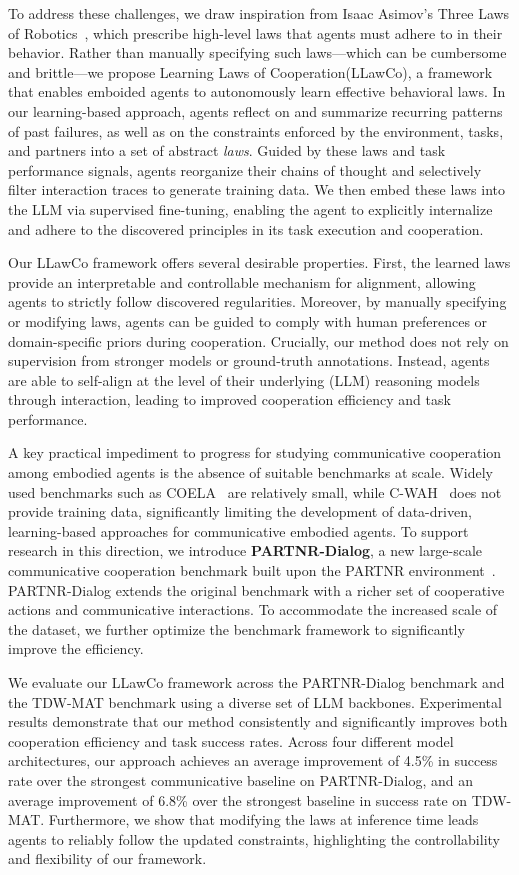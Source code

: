 \documentclass{article}
\theoremstyle{plain}
\theoremstyle{definition}
\theoremstyle{remark}
\newcommand{\fullname}{Learning Laws of Cooperation\xspace}
\newcommand{\name}{LLawCo\xspace}
\begin{document}
To address these challenges, we draw inspiration from Isaac Asimov’s Three Laws of Robotics~\cite{asimov2004robot}, which prescribe high-level laws that agents must adhere to in their behavior. Rather than manually specifying such laws—which can be cumbersome and brittle—we propose \fullname (\name), a framework that enables emboided agents to autonomously learn effective behavioral laws. In our learning-based approach, agents reflect on and summarize recurring patterns of past failures, as well as on the constraints enforced by the environment, tasks, and partners into a set of abstract \emph{laws}. Guided by these laws and task performance signals, agents reorganize their chains of thought and selectively filter interaction traces to generate training data. We then embed these laws into the LLM via supervised fine-tuning, enabling the agent to explicitly internalize and adhere to the discovered principles in its task execution and cooperation.

Our \name framework offers several desirable properties. First, the learned laws provide an interpretable and controllable mechanism for alignment, allowing agents to strictly follow discovered regularities. Moreover, by manually specifying or modifying laws, agents can be guided to comply with human preferences or domain-specific priors during cooperation. Crucially, our method does not rely on supervision from stronger models or ground-truth annotations. Instead, agents are able to self-align at the level of their underlying (LLM) reasoning models through interaction, leading to improved cooperation efficiency and task performance.

A key practical impediment to progress for studying communicative cooperation among embodied agents is the absence of suitable benchmarks at scale. Widely used benchmarks such as COELA~\cite{coela, tdw-transport} are relatively small, while C-WAH~\cite{wah, virtualhome} does not provide training data, significantly limiting the development of data-driven, learning-based approaches for communicative embodied agents. To support research in this direction, we introduce \textbf{PARTNR-Dialog}, a new large-scale communicative cooperation benchmark built upon the PARTNR environment~\cite{partnr, habitat3}. PARTNR-Dialog extends the original benchmark with a richer set of cooperative actions and communicative interactions. To accommodate the increased scale of the dataset, we further optimize the benchmark framework to significantly improve the efficiency.

We evaluate our \name framework across the PARTNR-Dialog benchmark and the TDW-MAT benchmark using a diverse set of LLM backbones. Experimental results demonstrate that our method consistently and significantly improves both cooperation efficiency and task success rates. Across four different model architectures, our approach achieves an average improvement of 4.5\% in success rate over the strongest communicative baseline on PARTNR-Dialog, and an average improvement of 6.8\% over the strongest baseline in success rate on TDW-MAT. Furthermore, we show that modifying the laws at inference time leads agents to reliably follow the updated constraints, highlighting the controllability and flexibility of our framework.
\end{document}
